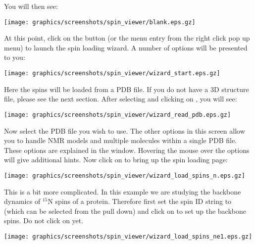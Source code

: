 You will then see:

\begin{minipage}[h]{\linewidth}
\centerline{\texttt{[image: graphics/screenshots/spin\_viewer/blank.eps.gz]}}
\label{figure: spin viewer blank}
\end{minipage}

At this point, click on the  button (or the  menu entry from the right click pop up menu) to launch the spin loading wizard.  A number of options will be presented to you: 

\begin{minipage}[h]{\linewidth}
\centerline{\texttt{[image: graphics/screenshots/spin\_viewer/wizard\_start.eps.gz]}}
\label{figure: spin viewer wizard start}
\end{minipage}

Here the spins will be loaded from a PDB file.  If you do not have a 3D structure file, please see the next section.  After selecting  and clicking on , you will see:

\begin{minipage}[h]{\linewidth}
\centerline{\texttt{[image: graphics/screenshots/spin\_viewer/wizard\_read\_pdb.eps.gz]}}
\end{minipage}

Now select the PDB file you wish to use.  The other options in this screen allow you to handle NMR models and multiple molecules within a single PDB file.  These options are explained in the window.  Hovering the mouse over the options will give additional hints.  Now click on  to bring up the spin loading page:

\begin{minipage}[h]{\linewidth}
\centerline{\texttt{[image: graphics/screenshots/spin\_viewer/wizard\_load\_spins\_n.eps.gz]}}
\end{minipage}

This is a bit more complicated.  In this example we are studying the backbone dynamics of $^{15}$N spins of a protein.  Therefore first set the spin ID string to  (which can be selected from the pull down) and click on  to set up the backbone spins.  Do not click on  yet.


\begin{minipage}[h]{\linewidth}
\centerline{\texttt{[image: graphics/screenshots/spin\_viewer/wizard\_load\_spins\_ne1.eps.gz]}}
\end{minipage}

